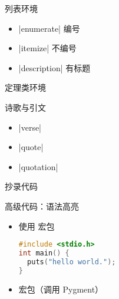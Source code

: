 \begin{frame}[fragile]{列表环境}
\begin{itemize}
\item |enumerate| 编号
\item |itemize| 不编号
\item |description| 有标题
\end{itemize}
\end{frame}

\begin{frame}[fragile]{定理类环境}
\end{frame}

\begin{frame}[fragile]{诗歌与引文}
\begin{itemize}
\item |verse|
\item |quote|
\item |quotation|
\end{itemize}
\end{frame}

\begin{frame}[fragile]{抄录代码}
\end{frame}

\begin{frame}[fragile]{高级代码：语法高亮}
\begin{itemize}
\item 使用  宏包
\begin{democode}
\begin{lstlisting}[language=C,
  basicstyle=\ttfamily,
  stringstyle=\color{blue}]
#include <stdio.h>
int main() {
  puts("hello world.");
}
\end{lstlisting}
\end{democode}
\item {} 宏包（调用 Pygment）
\end{itemize}
\end{frame}

